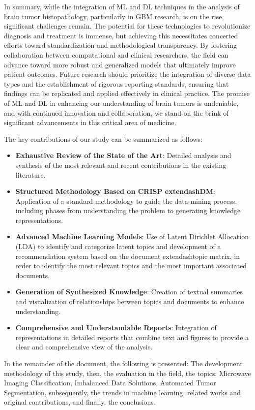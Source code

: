 \documentclass[runningheads]{llncs}
\begin{document}
In summary, while the integration of ML and DL techniques in the analysis of brain tumor histopathology, particularly in GBM research, is on the rise, significant challenges remain. The potential for these technologies to revolutionize diagnosis and treatment is immense, but achieving this necessitates concerted efforts toward standardization and methodological transparency. By fostering collaboration between computational and clinical researchers, the field can advance toward more robust and generalized models that ultimately improve patient outcomes. Future research should prioritize the integration of diverse data types and the establishment of rigorous reporting standards, ensuring that findings can be replicated and applied effectively in clinical practice. The promise of ML and DL in enhancing our understanding of brain tumors is undeniable, and with continued innovation and collaboration, we stand on the brink of significant advancements in this critical area of medicine.

The key contributions of our study can be summarized as follows: 

\begin{itemize}
    \item \textbf{Exhaustive Review of the State of the Art}: Detailed analysis and synthesis of the most relevant and recent contributions in the existing literature.
    \item \textbf{Structured Methodology Based on CRISP	extendash{}DM}: Application of a standard methodology to guide the data mining process, including phases from understanding the problem to generating knowledge representations.
    \item \textbf{Advanced Machine Learning Models}: Use of Latent Dirichlet Allocation (LDA) to identify and categorize latent topics and development of a recommendation system based on the document	extendash{}topic matrix, in order to identify the most relevant topics and the most important associated documents.
    \item \textbf{Generation of Synthesized Knowledge}: Creation of textual summaries and visualization of relationships between topics and documents to enhance understanding.
    \item \textbf{Comprehensive and Understandable Reports}: Integration of representations in detailed reports that combine text and figures to provide a clear and comprehensive view of the analysis.
\end{itemize}

In the remainder of the document, the following is presented: The development methodology of this study, then, the evaluation in the field, the topics: Microwave Imaging Classification, Imbalanced Data Solutions, Automated Tumor Segmentation,  subsequently, the trends in machine learning, related works and original contributions, and finally, the conclusions.
\end{document}
